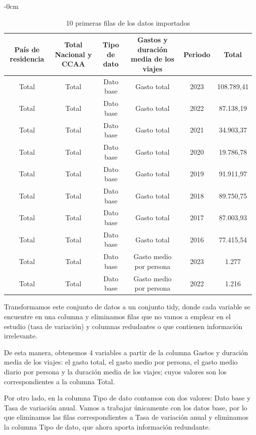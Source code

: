 \documentclass[data,article,submit,moreauthors,pdftex]{Definitions/mdpi}
\begin{document}
\begin{table}[H]

\caption{\label{tab:unnamed-chunk-4}10 primeras filas de los datos importados}
\begin{adjustwidth}{-\extralength}{0cm}
             \small
\begin{tabular}[t]{cccccc}
\toprule
País de residencia & Total Nacional y CCAA & Tipo de dato & Gastos y duración media de los viajes & Periodo & Total\\
\midrule
Total & Total & Dato base & Gasto total & 2023 & 108.789,41\\
Total & Total & Dato base & Gasto total & 2022 & 87.138,19\\
Total & Total & Dato base & Gasto total & 2021 & 34.903,37\\
Total & Total & Dato base & Gasto total & 2020 & 19.786,78\\
Total & Total & Dato base & Gasto total & 2019 & 91.911,97\\
Total & Total & Dato base & Gasto total & 2018 & 89.750,75\\
Total & Total & Dato base & Gasto total & 2017 & 87.003,93\\
Total & Total & Dato base & Gasto total & 2016 & 77.415,54\\
Total & Total & Dato base & Gasto medio por persona & 2023 & 1.277\\
Total & Total & Dato base & Gasto medio por persona & 2022 & 1.216\\
\bottomrule
\end{tabular}
    \end{adjustwidth}
\end{table}

Transformamos este conjunto de datos a un conjunto tidy, donde cada
variable se encuentre en una columna y eliminamos filas que no vamos a
emplear en el estudio (tasa de variación) y columnas redudantes o que
contienen información irrelevante.

De esta manera, obtenemos 4 variables a partir de la columna Gastos y
duración media de los viajes: el gasto total, el gasto medio por
persona, el gasto medio diario por persona y la duración media de los
viajes; cuyos valores son los correspondientes a la columna Total.

Por otro lado, en la columna Tipo de dato contamos con dos valores: Dato
base y Tasa de variación anual. Vamos a trabajar únicamente con los
datos base, por lo que eliminamos las filas correspondientes a Tasa de
variación anual y eliminamos la columna Tipo de dato, que ahora aporta
información redundante.
\end{document}
